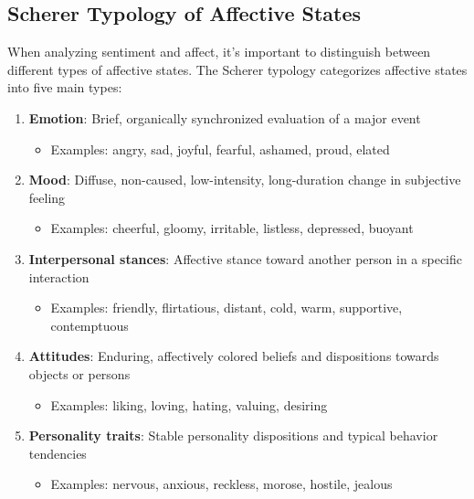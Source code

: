 \documentclass[11pt,a4paper]{article}
\theoremstyle{definition}
\theoremstyle{plain}
\theoremstyle{remark}
\begin{document}
\subsection{Scherer Typology of Affective States}

When analyzing sentiment and affect, it's important to distinguish between different types of affective states. The Scherer typology categorizes affective states into five main types:

\begin{enumerate}
    \item \textbf{Emotion}: Brief, organically synchronized evaluation of a major event
    \begin{itemize}
        \item Examples: angry, sad, joyful, fearful, ashamed, proud, elated
    \end{itemize}
    
    \item \textbf{Mood}: Diffuse, non-caused, low-intensity, long-duration change in subjective feeling
    \begin{itemize}
        \item Examples: cheerful, gloomy, irritable, listless, depressed, buoyant
    \end{itemize}
    
    \item \textbf{Interpersonal stances}: Affective stance toward another person in a specific interaction
    \begin{itemize}
        \item Examples: friendly, flirtatious, distant, cold, warm, supportive, contemptuous
    \end{itemize}
    
    \item \textbf{Attitudes}: Enduring, affectively colored beliefs and dispositions towards objects or persons
    \begin{itemize}
        \item Examples: liking, loving, hating, valuing, desiring
    \end{itemize}
    
    \item \textbf{Personality traits}: Stable personality dispositions and typical behavior tendencies
    \begin{itemize}
        \item Examples: nervous, anxious, reckless, morose, hostile, jealous
    \end{itemize}
\end{enumerate}
\end{document}
